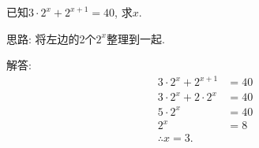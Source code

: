 \\ \\
\item{
    已知$3\cdot2^x + 2^{x+1}=40$, 求$x$.

        \fangsong{}
        思路: 将左边的2个$2^{x}$整理到一起.
    
        解答: 
        \begin{align*}
            3\cdot2^x + 2^{x+1} &= 40\\
            3\cdot2^x + 2\cdot 2^{x} &= 40\\
            5\cdot2^x &= 40\\
            2^x &= 8\\
            \therefore x = 3.
        \end{align*}
}
\\ \\